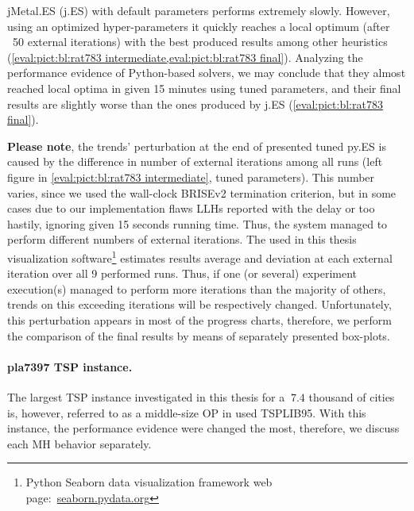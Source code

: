 jMetal.ES (j.ES) with default parameters performs extremely slowly. However, using an optimized hyper-parameters it quickly reaches a local optimum (after ~50 external iterations) with the best produced results among other heuristics (\cref{eval:pict:bl:rat783 intermediate,eval:pict:bl:rat783 final}). Analyzing the performance evidence of Python-based solvers, we may conclude that they almost reached local optima in given 15 minutes using tuned parameters, and their final results are slightly worse than the ones produced by j.ES (\cref{eval:pict:bl:rat783 final}).

\textbf{Please note}, the trends' perturbation at the end of presented tuned py.ES is caused by the difference in number of external iterations among all runs (left figure in \cref{eval:pict:bl:rat783 intermediate}, tuned parameters). This number varies, since we used the wall-clock BRISEv2 termination criterion, but in some cases due to our implementation flaws LLHs reported with the delay or too hastily, ignoring given 15 seconds running time. Thus, the system managed to perform different numbers of external iterations. The used in this thesis visualization software\footnote{Python Seaborn data visualization framework web page:~\href{https://seaborn.pydata.org/}{seaborn.pydata.org}} estimates results average and deviation at each external iteration over all 9 performed runs. Thus, if one (or several) experiment execution(s) managed to perform more iterations than the majority of others, trends on this exceeding iterations will be respectively changed. Unfortunately, this perturbation appears in most of the progress charts, therefore, we perform the comparison of the final results by means of separately presented box-plots.


\paragraph{pla7397 TSP instance.} 

The largest TSP instance investigated in this thesis for a $~7.4$ thousand of cities is, however, referred to as a middle-size OP in used TSPLIB95. With this instance, the performance evidence were changed the most, therefore, we discuss each MH behavior separately.


